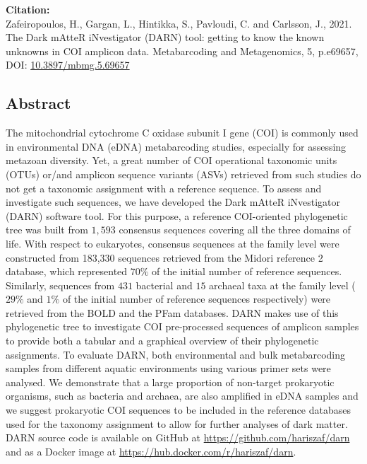 \textbf{Citation:} \\
Zafeiropoulos, H., Gargan, L., Hintikka, S., Pavloudi, C. and Carlsson, J., 2021. The Dark mAtteR iNvestigator (DARN) tool: getting to know the known unknowns in COI amplicon data. Metabarcoding and Metagenomics, 5, p.e69657, \\
DOI: \href{https://doi.org/10.3897/mbmg.5.69657}{10.3897/mbmg.5.69657}

   \subsection{Abstract}
   The mitochondrial cytochrome C oxidase subunit I gene (COI) is commonly used in environmental DNA (eDNA) metabarcoding studies, especially for assessing metazoan diversity. 
   Yet, a great number of COI operational taxonomic units (OTUs) or/and amplicon sequence variants (ASVs) retrieved from such studies do not get a taxonomic assignment with a reference sequence. 
   To assess and investigate such sequences, we have developed the Dark mAtteR iNvestigator (DARN) software tool. For this purpose, a reference COI-oriented phylogenetic tree was built from $1,593$ consensus sequences covering all the three domains of life. 
   With respect to eukaryotes, consensus sequences at the family level were constructed from 183,330 sequences retrieved from the Midori reference 2 database, which represented $70\%$ of the initial number of reference sequences. 
   Similarly, sequences from $431$ bacterial and $15$ archaeal taxa at the family level ($29\%$ and $1\%$ of the initial number of reference sequences respectively) were retrieved from the BOLD and the PFam databases. 
   DARN makes use of this phylogenetic tree to investigate COI pre-processed sequences of amplicon samples to provide both a tabular and a graphical overview of their phylogenetic assignments. 
   To evaluate DARN, both environmental and bulk metabarcoding samples from different aquatic environments using various primer sets were analysed. 
   We demonstrate that a large proportion of non-target prokaryotic organisms, such as bacteria and archaea, are also amplified in eDNA samples and we suggest prokaryotic COI sequences to be included in the reference databases used for the taxonomy assignment to allow for further analyses of dark matter. 
   DARN source code is available on GitHub at \href{https://github.com/hariszaf/darn}{https://github.com/hariszaf/darn} and as a Docker image at \href{https://hub.docker.com/r/hariszaf/darn}{https://hub.docker.com/r/hariszaf/darn}.

